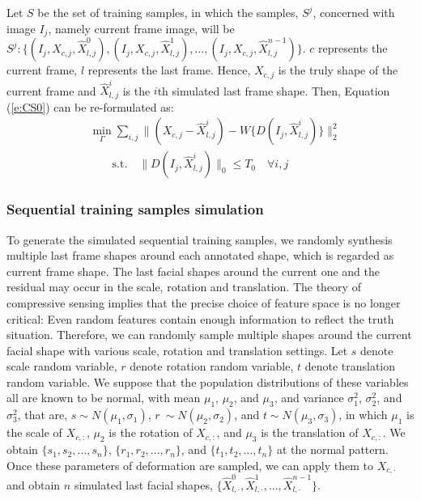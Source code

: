 \documentclass[a4paper, 10pt, conference]{ieeeconf}      %
\begin{document}
Let $S$ be the set of training samples, in which the samples, $S^j$, concerned with image $I_j$, namely current frame image, will be 
$S^j:\{ (I_j,X_{c,j},\hat{X}_{l,j}^0),(I_j,X_{c,j},\hat{X}_{l,j}^1), \dots ,(I_j,X_{c,j},\hat{X}_{l,j}^{n-1}) \}$.
$c$ represents the current frame, $l$ represents the last frame. Hence, $X_{c,j}$ is the truly shape of the current frame
and $\hat{X}_{l,j}^i$ is the $i$th simulated last frame shape. Then, Equation (\ref{e:CS0}) can be re-formulated as:
\begin{equation}
\label{e:CS1}
	\begin{split}
        &\min_{\Gamma} \sum_{i,j}{\|(X_{c,j} - \hat{X}^i_{l,j}) - W\{D(I_j,\hat{X}^i_{l,j})\}\|_2^2}\\
        &\quad\quad \text{s.t.}\quad \|D(I_j,\hat{X}^i_{l,j})\|_0 \leq T_0 \quad \forall i,j
	\end{split}
\end{equation}
\subsubsection{Sequential training samples simulation}
To generate the simulated sequential training samples, we randomly synthesis multiple last frame shapes around each annotated shape,
which is regarded as current frame shape.
The last facial shapes around the current one and the residual may occur in the scale, rotation and translation.
The theory of compressive sensing implies that the precise choice of feature space is no longer critical:
Even random features contain enough information to reflect the truth situation.
Therefore, we can randomly sample multiple shapes around the current
facial shape with various scale, rotation and translation settings.
Let $s$ denote scale random variable, $r$ denote rotation random variable, $t$ denote translation random variable.
We suppose that the population distributions of these variables all are known to be normal, with mean $\mu_1$, $ \mu_2$, and $\mu_3$,
and variance $\sigma_1^2$, $\sigma_2^2$, and $\sigma_3^2$, that are,
$s\sim N(\mu_1,\sigma_1)$, $r ~ \sim N(\mu_2, \sigma_2)$,
and $t \sim N(\mu_3,\sigma_3)$, in which $\mu_1$ is the scale of $X_{c,:}$, $\mu_2$ is the rotation of $X_{c,:}$,
and $\mu_3$ is the translation of $X_{c,:}$.
We obtain $\{s_1, s_2, ... , s_n\}$, $\{r_1, r_2, ... , r_n\}$, and $\{t_1, t_2, ... , t_n\}$ at the normal pattern. 
Once these parameters of deformation are sampled, we can apply them to $X_{c,\cdot}$ and obtain $n$ simulated last facial shapes,
$\{\hat{X}^0_{l,\cdot}, \hat{X}^1_{l,\cdot}, ... , \hat{X}^{n-1}_{l,\cdot}\}$.
\end{document}
